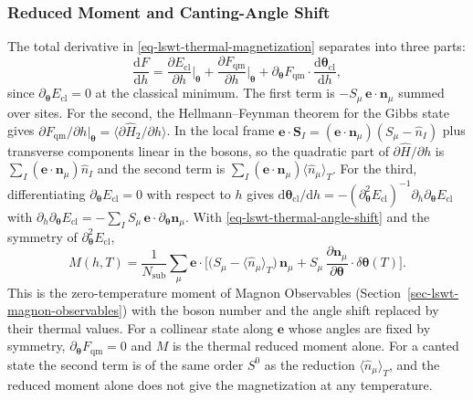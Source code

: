 \subsubsection{Reduced Moment and Canting-Angle Shift}

The total derivative in \eqref{eq-lswt-thermal-magnetization} separates into three parts:
\[
\frac{\mathrm dF}{\mathrm dh}
=\frac{\partial E_{\mathrm{cl}}}{\partial h}\bigg|_{\boldsymbol\theta}
+\frac{\partial F_{\mathrm{qm}}}{\partial h}\bigg|_{\boldsymbol\theta}
+\partial_{\boldsymbol\theta}F_{\mathrm{qm}}\cdot\frac{\mathrm d\boldsymbol\theta_{\mathrm{cl}}}{\mathrm dh},
\]
since \(\partial_{\boldsymbol\theta}E_{\mathrm{cl}}=0\) at the classical minimum. The first term is \(-S_\mu\,\mathbf e\cdot\mathbf n_\mu\) summed over sites. For the second, the Hellmann--Feynman theorem for the Gibbs state gives \(\partial F_{\mathrm{qm}}/\partial h|_{\boldsymbol\theta}=\langle\partial\hat H_2/\partial h\rangle\). In the local frame \(\mathbf e\cdot\mathbf S_I=(\mathbf e\cdot\mathbf n_\mu)(S_\mu-\hat n_I)\) plus transverse components linear in the bosons, so the quadratic part of \(\partial\hat H/\partial h\) is \(\sum_I(\mathbf e\cdot\mathbf n_\mu)\hat n_I\) and the second term is \(\sum_I(\mathbf e\cdot\mathbf n_\mu)\langle\hat n_\mu\rangle_T\). For the third, differentiating \(\partial_{\boldsymbol\theta}E_{\mathrm{cl}}=0\) with respect to \(h\) gives \(\mathrm d\boldsymbol\theta_{\mathrm{cl}}/\mathrm dh=-(\partial_{\boldsymbol\theta}^2E_{\mathrm{cl}})^{-1}\partial_h\partial_{\boldsymbol\theta}E_{\mathrm{cl}}\) with \(\partial_h\partial_{\boldsymbol\theta}E_{\mathrm{cl}}=-\sum_IS_\mu\,\mathbf e\cdot\partial_{\boldsymbol\theta}\mathbf n_\mu\). With \eqref{eq-lswt-thermal-angle-shift} and the symmetry of \(\partial_{\boldsymbol\theta}^2E_{\mathrm{cl}}\),
\begin{equation}\label{eq-lswt-thermal-magnetization-decomposition}
M(h,T)=\frac{1}{N_{\mathrm{sub}}}\sum_\mu\mathbf e\cdot\Big[\big(S_\mu-\langle\hat n_\mu\rangle_T\big)\,\mathbf n_\mu+S_\mu\,\frac{\partial\mathbf n_\mu}{\partial\boldsymbol\theta}\cdot\delta\boldsymbol\theta(T)\Big].
\end{equation}
This is the zero-temperature moment of Magnon Observables (Section~\ref{sec-lswt-magnon-observables}) with the boson number and the angle shift replaced by their thermal values. For a collinear state along \(\mathbf e\) whose angles are fixed by symmetry, \(\partial_{\boldsymbol\theta}F_{\mathrm{qm}}=0\) and \(M\) is the thermal reduced moment alone. For a canted state the second term is of the same order \(S^0\) as the reduction \(\langle\hat n_\mu\rangle_T\), and the reduced moment alone does not give the magnetization at any temperature.

